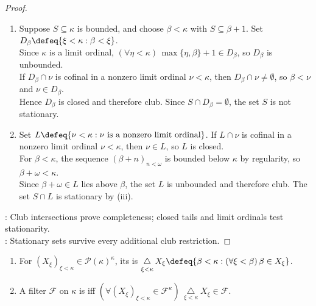 \begin{proposition}
\begin{proof}
\begin{enumerate}[label=(\roman*)]
As $D$ was arbitrary, $C\cap S$ is stationary.
\item Suppose $S\subseteq\kappa$ is bounded, and choose $\beta<\kappa$ with $S\subseteq\beta+1$. Set $D_\beta\defeq\{\xi<\kappa:\beta<\xi\}$.\\
Since $\kappa$ is a limit ordinal, $(\forall\eta<\kappa)\,\max\{\eta,\beta\}+1\in D_\beta$, so $D_\beta$ is unbounded.\\
If $D_\beta\cap\nu$ is cofinal in a nonzero limit ordinal $\nu<\kappa$, then $D_\beta\cap\nu\neq\emptyset$, so $\beta<\nu$ and $\nu\in D_\beta$.\\
Hence $D_\beta$ is closed and therefore club. Since $S\cap D_\beta=\emptyset$, the set $S$ is not stationary.
\item Set $L\defeq\{\nu<\kappa:\nu\text{ is a nonzero limit ordinal}\}$. If $L\cap\nu$ is cofinal in a nonzero limit ordinal $\nu<\kappa$, then $\nu\in L$, so $L$ is closed.\\
For $\beta<\kappa$, the sequence $(\beta+n)_{n<\omega}$ is bounded below $\kappa$ by regularity, so $\beta+\omega<\kappa$.\\
Since $\beta+\omega\in L$ lies above $\beta$, the set $L$ is unbounded and therefore club. The set $S\cap L$ is stationary by (iii).
\end{enumerate}
: Club intersections prove completeness; closed tails and limit ordinals test stationarity.\\
: Stationary sets survive every additional club restriction.
\end{proof}
\end{proposition}

\begin{definition} \label{def:diagonal-intersection-and-normal-filter} 
\begin{enumerate}[label=(\roman*)]
\setlength{\itemsep}{0pt}
\item For $(X_\xi)_{\xi<\kappa}\in\mathcal{P}(\kappa)^\kappa$, its  is $\mathop{\triangle}\limits_{\xi<\kappa}X_\xi\defeq\{\beta<\kappa:(\forall\xi<\beta)\,\beta\in X_\xi\}$.
\item A filter $\mathcal{F}$ on $\kappa$ is  iff $(\forall(X_\xi)_{\xi<\kappa}\in\mathcal{F}^\kappa)\,\mathop{\triangle}\limits_{\xi<\kappa}X_\xi\in\mathcal{F}$.
\end{enumerate}
\end{definition}

